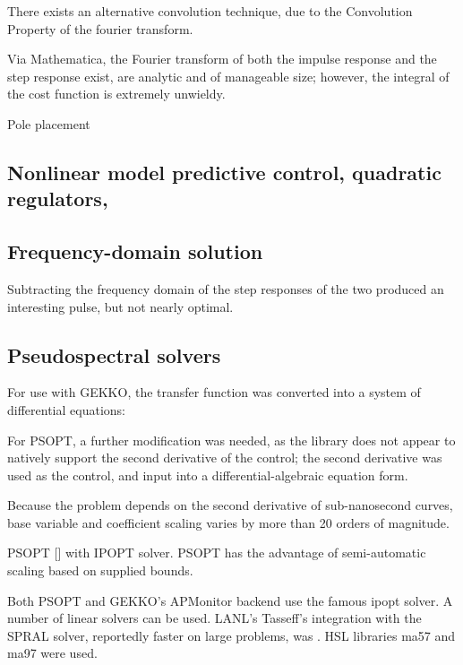 \documentclass[fleqn,10pt]{paper}
\begin{document}
There exists an alternative convolution technique, due to the Convolution Property of the fourier transform.

Via Mathematica, the Fourier transform of both the impulse response and the step response exist, are analytic and of manageable size; however, the integral of the cost function is extremely unwieldy.


Pole placement

\subsection*{Nonlinear model predictive control, quadratic regulators, }

\subsection*{Frequency-domain solution}

Subtracting the frequency domain of the step responses of the two produced an interesting pulse, but not nearly optimal.


\subsection*{Pseudospectral solvers}



For use with GEKKO, the transfer function was converted into a system of differential equations:

For PSOPT, a further modification was needed, as the library does not appear to natively support the second derivative of the control; the second derivative was used as the control, and input into a differential-algebraic equation form.

Because the problem depends on the second derivative of sub-nanosecond curves, base variable and coefficient scaling varies by more than 20 orders of magnitude. 

PSOPT [] with IPOPT\cite{implementation2006} solver. PSOPT has the advantage of semi-automatic scaling based on supplied bounds. 

Both PSOPT and GEKKO's APMonitor backend use the famous ipopt solver. A number of linear solvers can be used. LANL's Tasseff's integration with the SPRAL solver, reportedly faster on large problems, was . HSL libraries ma57 and ma97 were used.
\end{document}
